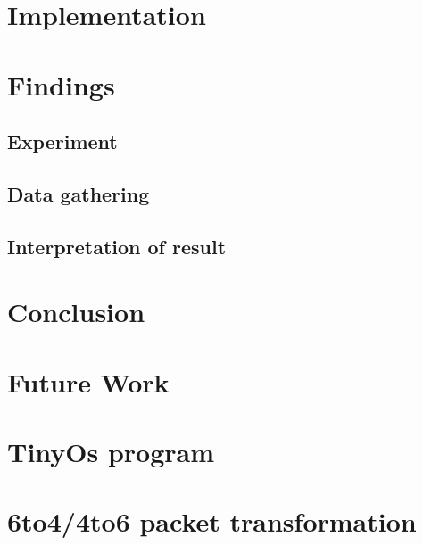 \documentclass[oneside,12pt,a4paper,final]{book}
\begin{document}
\chapter{Implementation}


\chapter{Findings}
\section{Experiment}
\section{Data gathering}
\section{Interpretation of result}

\chapter{Conclusion}

\chapter{Future Work}

\appendix
\chapter{TinyOs program}
\chapter{6to4/4to6 packet transformation}

\backmatter

\singlespacing
\printglossaries
 

\end{document}
